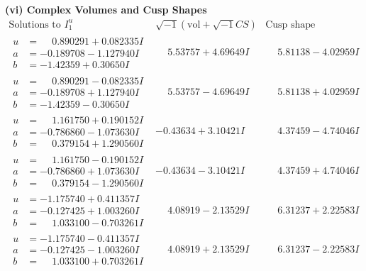 \documentclass[1p]{elsarticle_modified}
\theoremstyle{definition}
\newcommand{\I}{\sqrt{-1}}
\begin{document}
\newpage\flushleft \textbf{(vi) Complex Volumes and Cusp Shapes}
$$\begin{array}{c|c|c}  
\text{Solutions to }I^u_{1}& \I (\text{vol} + \sqrt{-1}CS) & \text{Cusp shape}\\
 \hline 
\begin{aligned}
u &= \phantom{-}0.890291 + 0.082335 I \\
a &= -0.189708 - 1.127940 I \\
b &= -1.42359 + 0.30650 I\end{aligned}
 & \phantom{-}5.53757 + 4.69649 I & \phantom{-}5.81138 - 4.02959 I \\ \hline\begin{aligned}
u &= \phantom{-}0.890291 - 0.082335 I \\
a &= -0.189708 + 1.127940 I \\
b &= -1.42359 - 0.30650 I\end{aligned}
 & \phantom{-}5.53757 - 4.69649 I & \phantom{-}5.81138 + 4.02959 I \\ \hline\begin{aligned}
u &= \phantom{-}1.161750 + 0.190152 I \\
a &= -0.786860 - 1.073630 I \\
b &= \phantom{-}0.379154 + 1.290560 I\end{aligned}
 & -0.43634 + 3.10421 I & \phantom{-}4.37459 - 4.74046 I \\ \hline\begin{aligned}
u &= \phantom{-}1.161750 - 0.190152 I \\
a &= -0.786860 + 1.073630 I \\
b &= \phantom{-}0.379154 - 1.290560 I\end{aligned}
 & -0.43634 - 3.10421 I & \phantom{-}4.37459 + 4.74046 I \\ \hline\begin{aligned}
u &= -1.175740 + 0.411357 I \\
a &= -0.127425 + 1.003260 I \\
b &= \phantom{-}1.033100 - 0.703261 I\end{aligned}
 & \phantom{-}4.08919 - 2.13529 I & \phantom{-}6.31237 + 2.22583 I \\ \hline\begin{aligned}
u &= -1.175740 - 0.411357 I \\
a &= -0.127425 - 1.003260 I \\
b &= \phantom{-}1.033100 + 0.703261 I\end{aligned}
 & \phantom{-}4.08919 + 2.13529 I & \phantom{-}6.31237 - 2.22583 I \\ \hline\begin{aligned}

\end{aligned}
\end{array}$$
\end{document}
